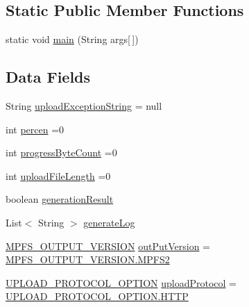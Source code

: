 \subsection*{Static Public Member Functions}
\begin{DoxyCompactItemize}
\item 
static void \hyperlink{class_microchip_m_p_f_s_1_1_main_m_p_f_s_a75988cf84fc6ee7a2ebff36e363021aa}{main} (String args\mbox{[}$\,$\mbox{]})
\end{DoxyCompactItemize}
\subsection*{Data Fields}
\begin{DoxyCompactItemize}
\item 
String \hyperlink{class_microchip_m_p_f_s_1_1_main_m_p_f_s_a0a1cccbd8ce545a48c52faf11bf33100}{upload\+Exception\+String} = null
\item 
int \hyperlink{class_microchip_m_p_f_s_1_1_main_m_p_f_s_a4deb75764e195abd8142ff2e75a3f5bf}{percen} =0
\item 
int \hyperlink{class_microchip_m_p_f_s_1_1_main_m_p_f_s_ad93aeeb304f4c0e3a132cb35bc95a562}{progress\+Byte\+Count} =0
\item 
int \hyperlink{class_microchip_m_p_f_s_1_1_main_m_p_f_s_a2ffcaed45e002eeca8deb570d7d042f4}{upload\+File\+Length} =0
\item 
boolean \hyperlink{class_microchip_m_p_f_s_1_1_main_m_p_f_s_aec694e32fa7ea749acc571eaff488373}{generation\+Result}
\item 
List$<$ String $>$ \hyperlink{class_microchip_m_p_f_s_1_1_main_m_p_f_s_a0ae8d4832a0d03b106c2a90379567b72}{generate\+Log}
\item 
\hyperlink{enum_microchip_m_p_f_s_1_1_main_m_p_f_s_1_1_m_p_f_s___o_u_t_p_u_t___v_e_r_s_i_o_n}{M\+P\+F\+S\+\_\+\+O\+U\+T\+P\+U\+T\+\_\+\+V\+E\+R\+S\+I\+O\+N} \hyperlink{class_microchip_m_p_f_s_1_1_main_m_p_f_s_a1400453cb8838a64ba2906f6e3e1c5a1}{out\+Put\+Version} = \hyperlink{enum_microchip_m_p_f_s_1_1_main_m_p_f_s_1_1_m_p_f_s___o_u_t_p_u_t___v_e_r_s_i_o_n_a5a92d98af3b89fdd193668f0fe3dedb8}{M\+P\+F\+S\+\_\+\+O\+U\+T\+P\+U\+T\+\_\+\+V\+E\+R\+S\+I\+O\+N.\+M\+P\+F\+S2}
\item 
\hyperlink{enum_microchip_m_p_f_s_1_1_main_m_p_f_s_1_1_u_p_l_o_a_d___p_r_o_t_o_c_o_l___o_p_t_i_o_n}{U\+P\+L\+O\+A\+D\+\_\+\+P\+R\+O\+T\+O\+C\+O\+L\+\_\+\+O\+P\+T\+I\+O\+N} \hyperlink{class_microchip_m_p_f_s_1_1_main_m_p_f_s_a7e85b53b2e0d1f688b7675b360e2f84f}{upload\+Protocol} = \hyperlink{enum_microchip_m_p_f_s_1_1_main_m_p_f_s_1_1_u_p_l_o_a_d___p_r_o_t_o_c_o_l___o_p_t_i_o_n_a5bef6cce6371cc388126fd18c0173579}{U\+P\+L\+O\+A\+D\+\_\+\+P\+R\+O\+T\+O\+C\+O\+L\+\_\+\+O\+P\+T\+I\+O\+N.\+H\+T\+T\+P}

\end{DoxyCompactItemize}
